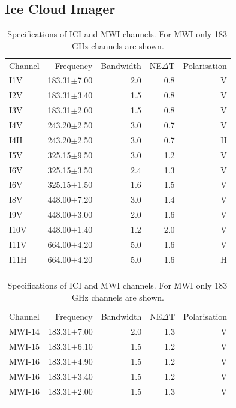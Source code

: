 \documentclass[amt, manuscript]{copernicus}
\begin{document}
\subsection{Ice Cloud Imager}
%
\begin{table}[t]	
	\caption{Specifications of ICI and MWI channels. For MWI only 183\,GHz channels are shown.}
	\label{tab:ICI_MWI_channels}
	\begin{tabular}{lrrrr}
		\tophline
		Channel & Frequency 	& Bandwidth  	&NE$\Delta$T	&Polarisation\\
		\middlehline
		I1V&	183.31$\pm$7.00    & 2.0 			& 0.8 		& V\\
		I2V&	183.31$\pm$3.40    & 1.5 			& 0.8 		& V\\
		I3V&	183.31$\pm$2.00    & 1.5 			& 0.8 		& V\\
		I4V&	243.20$\pm$2.50    & 3.0 			& 0.7 		& V\\
		I4H&	243.20$\pm$2.50    & 3.0 			& 0.7 		& H\\
		I5V&	325.15$\pm$9.50    & 3.0 			& 1.2 		& V\\
		I6V&	325.15$\pm$3.50    & 2.4 			& 1.3 		& V\\
		I6V&	325.15$\pm$1.50    & 1.6 			& 1.5 		& V\\
		I8V&	448.00$\pm$7.20    & 3.0 			& 1.4 		& V\\
		I9V&	448.00$\pm$3.00    & 2.0 			& 1.6 		& V\\
		I10V&	448.00$\pm$1.40    & 1.2 			& 2.0 		& V\\
		I11V&	664.00$\pm$4.20    & 5.0 			& 1.6 		& V\\
		I11H&	664.00$\pm$4.20    & 5.0 			& 1.6 		& H\\		
		\bottomhline
	\end{tabular}
	\begin{tabular}{lrrrr}
		\tophline
		Channel & Frequency 	& Bandwidth  	&NE$\Delta$T	&Polarisation\\
		\middlehline
		MWI-14&	183.31$\pm$7.00    & 2.0 			& 1.3 		& V\\
		MWI-15&	183.31$\pm$6.10    & 1.5 			& 1.2 		& V\\
		MWI-16&	183.31$\pm$4.90    & 1.5 			& 1.2 		& V\\
		MWI-16&	183.31$\pm$3.40    & 1.5 			& 1.2 		& V\\
		MWI-16&	183.31$\pm$2.00    & 1.5 			& 1.3 		& V\\	
		\bottomhline
	\end{tabular}
	\belowtable{} %
\end{table}
\end{document}
